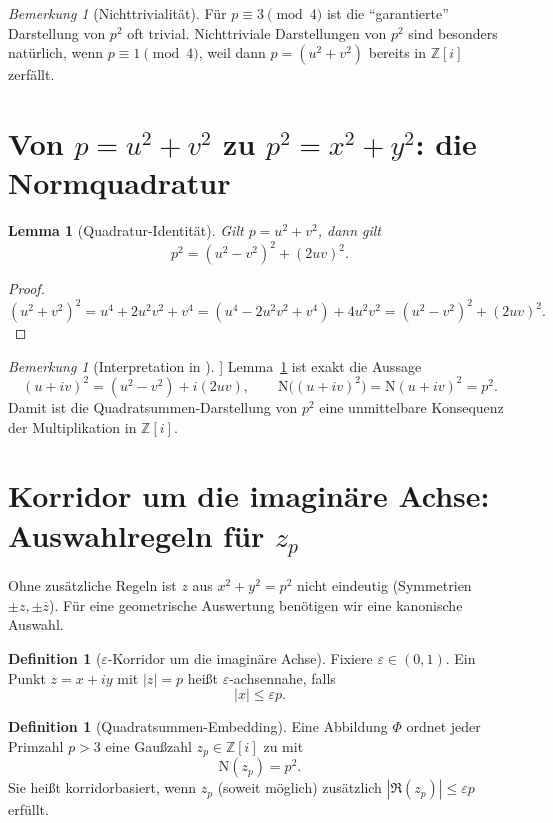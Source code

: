 \documentclass[a4paper,11pt]{article}
\newtheorem{lemma}[satz]{Lemma}
\theoremstyle{definition}
\newtheorem{definition}[satz]{Definition}
\theoremstyle{remark}
\newtheorem{bemerkung}[satz]{Bemerkung}
\newcommand{\Zi}{\mathbb{Z}[i]}
\newcommand{\Norm}{\mathrm{N}}
\begin{document}
	\begin{bemerkung}[Nichttrivialität]
		Für \(p\equiv 3\pmod4\) ist die ``garantierte'' Darstellung von \(p^2\) oft trivial. Nichttriviale Darstellungen
		von \(p^2\) sind besonders natürlich, wenn \(p\equiv 1\pmod4\), weil dann \(p=(u^2+v^2)\) bereits in \(\Zi\) zerfällt.
	\end{bemerkung}
	
	\section{Von \(p=u^2+v^2\) zu \(p^2=x^2+y^2\): die Normquadratur}
	\begin{lemma}[Quadratur-Identität]
		\label{lem:square}
		Gilt \(p=u^2+v^2\), dann gilt
		\[
		p^2=(u^2-v^2)^2+(2uv)^2.
		\]
	\end{lemma}
	
	\begin{proof}
		\[
		(u^2+v^2)^2=u^4+2u^2v^2+v^4=(u^4-2u^2v^2+v^4)+4u^2v^2=(u^2-v^2)^2+(2uv)^2.
		\]
	\end{proof}
	
	\begin{bemerkung}[Interpretation in \(\Zi\)]
		Lemma~\ref{lem:square} ist exakt die Aussage
		\[
		(u+iv)^2=(u^2-v^2)+i(2uv),\qquad \Norm\big((u+iv)^2\big)=\Norm(u+iv)^2=p^2.
		\]
		Damit ist die Quadratsummen-Darstellung von \(p^2\) eine unmittelbare Konsequenz der Multiplikation in \(\Zi\).
	\end{bemerkung}
	
	\section{Korridor um die imaginäre Achse: Auswahlregeln für \(z_p\)}
	Ohne zusätzliche Regeln ist \(z\) aus \(x^2+y^2=p^2\) nicht eindeutig (Symmetrien \(\pm z, \pm\overline z\)).
	Für eine geometrische Auswertung benötigen wir eine kanonische Auswahl.
	
	\begin{definition}[\(\varepsilon\)-Korridor um die imaginäre Achse]
		Fixiere \(\varepsilon\in(0,1)\). Ein Punkt \(z=x+iy\) mit \(|z|=p\) heißt \(\varepsilon\)-achsennahe, falls
		\[
		|x|\le \varepsilon p.
		\]
	\end{definition}
	
	\begin{definition}[Quadratsummen-Embedding]
		\label{def:embed}
		Eine Abbildung \(\Phi\) ordnet jeder Primzahl \(p>3\) eine Gaußzahl \(z_p\in\Zi\) zu mit
		\[
		\Norm(z_p)=p^2.
		\]
		Sie heißt korridorbasiert, wenn \(z_p\) (soweit möglich) zusätzlich \(|\Re(z_p)|\le \varepsilon p\) erfüllt.
	\end{definition}
	
\end{document}
